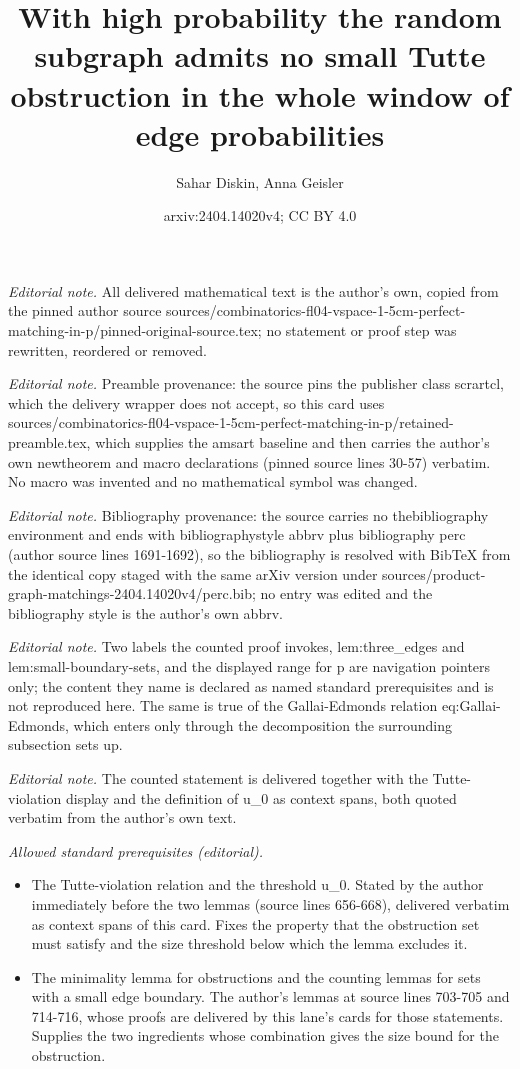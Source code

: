 \documentclass[10pt,a4paper]{amsart}
\title{With high probability the random subgraph admits no small Tutte obstruction in the whole window of edge probabilities}
\author{Sahar Diskin, Anna Geisler}
\date{arxiv:2404.14020v4; CC BY 4.0}
\begin{document}
\maketitle
\noindent\textit{Editorial note.} All delivered mathematical text is the author's own, copied from the pinned author source sources/combinatorics-fl04-vspace-1-5cm-perfect-matching-in-p/pinned-original-source.tex; no statement or proof step was rewritten, reordered or removed.\par\medskip
\noindent\textit{Editorial note.} Preamble provenance: the source pins the publisher class scrartcl, which the delivery wrapper does not accept, so this card uses sources/combinatorics-fl04-vspace-1-5cm-perfect-matching-in-p/retained-preamble.tex, which supplies the amsart baseline and then carries the author's own newtheorem and macro declarations (pinned source lines 30-57) verbatim. No macro was invented and no mathematical symbol was changed.\par\medskip
\noindent\textit{Editorial note.} Bibliography provenance: the source carries no thebibliography environment and ends with bibliographystyle abbrv plus bibliography perc (author source lines 1691-1692), so the bibliography is resolved with BibTeX from the identical copy staged with the same arXiv version under sources/product-graph-matchings-2404.14020v4/perc.bib; no entry was edited and the bibliography style is the author's own abbrv.\par\medskip
\noindent\textit{Editorial note.} Two labels the counted proof invokes, lem:three\_edges and lem:small-boundary-sets, and the displayed range for p are navigation pointers only; the content they name is declared as named standard prerequisites and is not reproduced here. The same is true of the Gallai-Edmonds relation eq:Gallai-Edmonds, which enters only through the decomposition the surrounding subsection sets up.\par\medskip
\noindent\textit{Editorial note.} The counted statement is delivered together with the Tutte-violation display and the definition of u\_0 as context spans, both quoted verbatim from the author's own text.\par\medskip
\noindent\textit{Allowed standard prerequisites (editorial).}\begin{itemize}
\item The Tutte-violation relation and the threshold u\_0. Stated by the author immediately before the two lemmas (source lines 656-668), delivered verbatim as context spans of this card. Fixes the property that the obstruction set must satisfy and the size threshold below which the lemma excludes it.
\item The minimality lemma for obstructions and the counting lemmas for sets with a small edge boundary. The author's lemmas at source lines 703-705 and 714-716, whose proofs are delivered by this lane's cards for those statements. Supplies the two ingredients whose combination gives the size bound for the obstruction.
\end{itemize}\medskip
\end{document}
